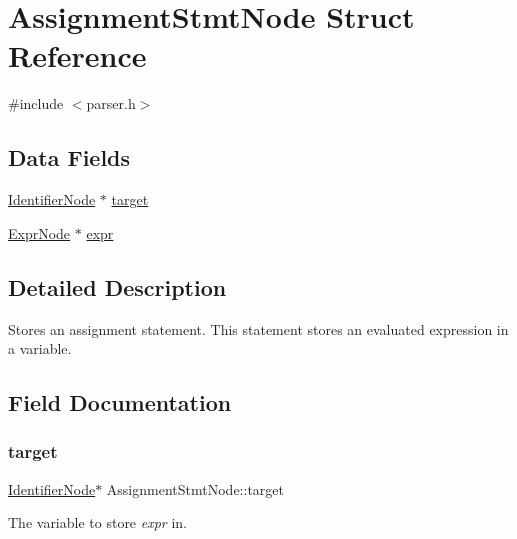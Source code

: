 \hypertarget{struct_assignment_stmt_node}{}\section{Assignment\+Stmt\+Node Struct Reference}
\label{struct_assignment_stmt_node}


{\ttfamily \#include $<$parser.\+h$>$}

\subsection*{Data Fields}
\begin{DoxyCompactItemize}
\item 
\hyperlink{parser_8h_a930727769b8a8eb0d24d474f3aa12a43}{Identifier\+Node} $\ast$ \hyperlink{struct_assignment_stmt_node_a6bdcf7c297f54d4269849cb96c8161a6}{target}
\item 
\hyperlink{struct_expr_node}{Expr\+Node} $\ast$ \hyperlink{struct_assignment_stmt_node_af25b11d4ed4159da853c540641f0db24}{expr}
\end{DoxyCompactItemize}


\subsection{Detailed Description}
Stores an assignment statement. This statement stores an evaluated expression in a variable. 

\subsection{Field Documentation}
\mbox{\label{struct_assignment_stmt_node_a6bdcf7c297f54d4269849cb96c8161a6}} 
\subsubsection{\texorpdfstring{target}{target}}
{\footnotesize\ttfamily \hyperlink{parser_8h_a930727769b8a8eb0d24d474f3aa12a43}{Identifier\+Node}$\ast$ Assignment\+Stmt\+Node\+::target}

The variable to store {\itshape expr} in. \mbox{\label{struct_assignment_stmt_node_af25b11d4ed4159da853c540641f0db24}} 
